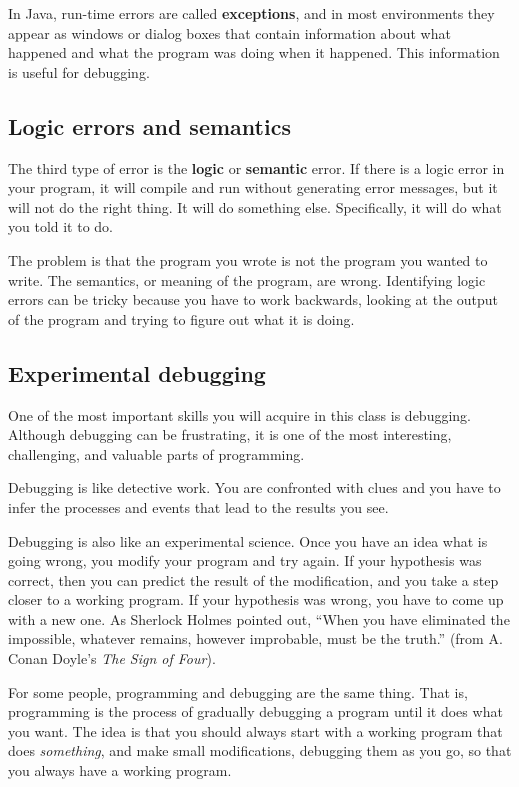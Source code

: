 \documentclass[12pt]{book}
\theoremstyle{definition}
\begin{document}
In Java, run-time errors are called {\bf exceptions},
and in most environments they appear as windows or dialog
boxes that contain information about what happened and what
the program was doing when it happened.  This information is
useful for debugging.

\subsection{Logic errors and semantics}

The third type of error is the {\bf logic} or {\bf semantic} error.
If there is a logic error in your program, it will compile and run
without generating error messages, but it will not do the right thing.
It will do something else.  Specifically, it will do what you told it
to do.

The problem is that the program you wrote is not the program you
wanted to write.  The semantics, or meaning of the program, are wrong.
Identifying logic errors can be tricky because you have to work
backwards, looking at the output of the program and trying to figure
out what it is doing.

\subsection{Experimental debugging}

One of the most important skills you will acquire in this
class is debugging.  Although debugging can be frustrating, it
is one of the most interesting, challenging, and
valuable parts of programming.

Debugging is like detective work.  You are
confronted with clues and you have to infer the processes
and events that lead to the results you see.

Debugging is also like an experimental science.  Once you have an idea
what is going wrong, you modify your program and try again.  If your
hypothesis was correct, then you can predict the result of the
modification, and you take a step closer to a working program.  If
your hypothesis was wrong, you have to come up with a new one.  As
Sherlock Holmes pointed out, ``When you have eliminated the
impossible, whatever remains, however improbable, must be the truth.''
(from A. Conan Doyle's {\em The Sign of Four}).


For some people, programming and debugging are the
same thing.  That is, programming is the process of gradually
debugging a program until it does what you want.  The idea
is that you should always start with a working program that
does {\em something}, and make small modifications, debugging
them as you go, so that you always have a working program.
\end{document}
